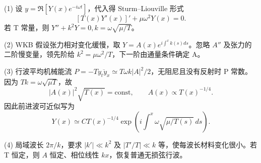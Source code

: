 (1) 设 \(y=\Re[Y(x)e^{-i\omega t}]\)，代入得 Sturm–Liouville 形式
\[
[T(x)Y'(x)]'+\mu\omega^2Y(x)=0.
\]
若 T 常量，则 \(Y''+k^2Y=0,k=\omega\sqrt{\mu/T}\)。

(2) WKB 假设张力相对变化缓慢，取 \(Y=A(x)e^{i\int^x k(s)ds}\)。忽略 \(A''\) 及张力的二阶慢变量，领先阶给 \(k^2=\mu\omega^2/T\)，下一阶由通量条件确定 A。

(3) 行波平均机械能流 \(P=-T\overline{y_t y_x}\simeq T\omega k|A|^2/2\)，无阻尼且没有反射时 P 常数。因为 \(Tk=\omega\sqrt{\mu T}\)，故
\[
|A(x)|^2\sqrt{T(x)}=\mathrm{const},\qquad
A(x)\propto T(x)^{-1/4}.
\]
因此前进波可近似写为
\[
Y(x)\simeq C T(x)^{-1/4}\exp\!\left(i\int^x\omega\sqrt{\mu/T(s)}\,ds\right).
\]

(4) 局域波长 \(2\pi/k\)，要求 \(|k'|\ll k^2\) 及 \(|T'/T|\ll k\) 等，使每波长材料变化很小。若 T 恒定，则 \(A\) 恒定、相位线性 \(kx\)，恢复普通无损弦行波。
